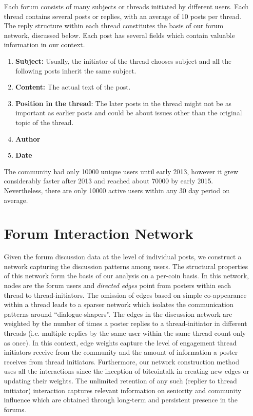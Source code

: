 Each forum consists of many subjects or threads initiated by different users.
Each thread contains several posts or replies, with an average of 10 posts per
thread.  The reply structure within each thread constitutes the basis of our
forum network, discussed below.  Each post has several fields which contain
valuable information in our context.
\begin{enumerate}[topsep=0pt,itemsep=-0.5ex,partopsep=1ex,parsep=1ex]
  \item \textbf{Subject:} Usually, the initiator of the thread chooses subject and all the
    following posts inherit the same subject.
  \item \textbf{Content:} The actual text of the post.
  \item \textbf{Position in the thread}: The later posts in the thread might not be as important
    as earlier posts and could be about issues other than the original topic of the thread.
  \item \textbf{Author}
  \item \textbf{Date}
\end{enumerate}
The community had only 10000 unique users until early 2013, however it grew considerably faster after 2013 and reached about 70000 by early 2015.
Nevertheless, there are only 10000 active users within any 30 day period on average.

\section{Forum Interaction Network}

Given the forum discussion data at the level of individual posts, we  construct a network capturing the discussion patterns among users. The structural properties of this network form the basis of our analysis on a per-coin basis. In this network, nodes are the forum users and \textit{directed edges} point from posters within each thread to thread-initiators. The omission of edges based on simple co-appearance within a thread leads to a sparser network which isolates the communication patterns around ``dialogue-shapers''. The edges in the discussion network are weighted by the number of times a poster replies to a thread-initiator in different threads (i.e. multiple replies by the same user within the same thread count only as once).
In this context, edge weights capture the level of engagement thread initiators receive from the community and the amount of information a poster receives from thread initiators. Furthermore, our network construction method uses all the interactions since the inception of bitcointalk in creating new edges or updating their weights. The unlimited retention of any such (replier to thread initiator) interaction captures relevant information on seniority and community influence which are obtained through long-term and persistent presence in the forums. 

